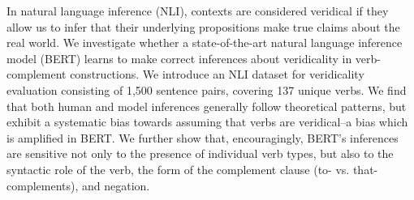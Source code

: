 In natural language inference (NLI), contexts are considered veridical if they allow us to infer that their underlying propositions make true claims about the real world. We investigate whether a state-of-the-art natural language inference model (BERT) learns to make correct inferences about veridicality in verb-complement constructions. We introduce an NLI dataset for veridicality evaluation consisting of 1,500 sentence pairs, covering 137 unique verbs. We find that both human and model inferences generally follow theoretical patterns, but exhibit a systematic bias towards assuming that verbs are veridical--a bias which is amplified in BERT. We further show that, encouragingly, BERT's inferences are sensitive not only to the presence of individual verb types, but also to the syntactic role of the verb, the form of the complement clause (to- vs. that-complements), and negation.
